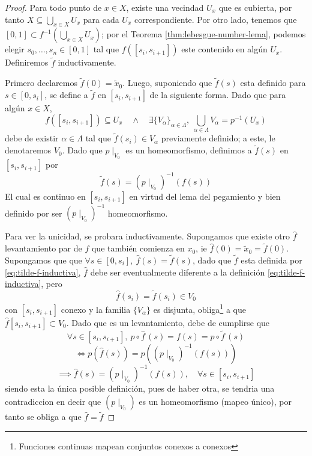 \begin{proof}
  Para todo punto de \(x \in X\), existe una vecindad \(U_x\) que es
  cubierta, por tanto \( X \subseteq \bigcup_{x \in X} U_x\) para cada
  \(U_x\) correspondiente.
  Por otro lado, tenemos que \( [0,1] \subset f^{-1} (\bigcup_{x
  \in X} U_x)\); por el Teorema \ref{thm:lebesgue-number-lema}, podemos
  elegir \(s_0,\dotsc,s_n \in [0,1]\) tal que \(f([s_i, s_{i+1}])\) este contenido
  en algún \(U_x\). Definiremos \(\tilde f\) inductivamente.

  Primero declaremos \(\tilde f (0) = \tilde x _0\). Luego, suponiendo
  que \(\tilde f (s)\) esta definido para \(s \in [0, s_i]\), se
  define a \(\tilde f \) en \([s_i, s_{i+1}]\) de la siguiente forma.
  Dado que para algún \(x \in X\),
  \[f ([s_i, s_{i+1}]) \subseteq U_x \quad \land \quad \exists
    \{V_\alpha\}_{\alpha \in \Lambda},\ \bigcup_{\alpha \in \Lambda}
    V_\alpha = p^{-1} (U_x)\]
  debe de existir \(\alpha \in \Lambda\) tal que \(\tilde f (s_i) \in
  V_\alpha\) previamente definido; a este, le denotaremos \(V_0\). Dado
  que \(p \mid_{V_0}\) es un homeomorfismo, definimos a \(\tilde f (s)\)
  en \([s_i, s_{i+1}]\) por
  \begin{equation}
  \tilde f (s) = (p \mid _{V_0})^{-1} (f(s))\label{eq:tilde-f-inductiva}
  \end{equation}
  El cual es continuo en \([s_i, s_{i+1}]\) en virtud del lema del
  pegamiento y bien definido por ser \((p \mid _{V_0})^{-1} \) homeomorfismo.

  Para ver la unicidad, se probara inductivamente. Supongamos que existe
  otro \(\hat{f}\) levantamiento par de \(f\) que también
  comienza en \(x_0\), ie \(\hat{f} (0) = \tilde x _0 = \tilde f
  (0)\). Supongamos que que \(\forall s \in [0, s_i],\ \hat{f}
  (s) = \tilde f (s)\), dado que \(\tilde f\) esta definida por
  \eqref{eq:tilde-f-inductiva}, \(\hat f\) debe ser
  eventualmente diferente a la definición \eqref{eq:tilde-f-inductiva},
  pero
  \[\hat f (s_i) = \tilde f (s_i) \in V_0\]
  con \([s_i, s_{i+1}]\) conexo y la familia \(\{V_\alpha\}\)
  es disjunta, obliga\footnote{Funciones continuas mapean conjuntos
    conexos a conexos} a que \(\hat f [s_i, s_{i+1}] \subset
  V_0\). Dado que es un levantamiento, debe de cumplirse que
  \[\forall s \in [s_i, s_{i+1}],\ p \circ \hat f \, (s) =
    f(s) = p \circ \tilde f \, (s) \]
  \[ \iff p ( \hat f (s)) = p ((p \mid_{V_0})^{-1} (f (s)))\]
  \[ \implies \hat f (s) = (p \mid_{V_0})^{-1} (f (s)), \quad \forall s
      \in [s_i, s_{i+1}]\]
  siendo esta la única posible definición, pues de haber otra,
  se tendria una contradiccion en decir que \((p \mid_{V_0})\) es un
  homeomorfismo (mapeo único), por tanto se obliga a que \( \hat f =
\tilde f\)
\end{proof}
